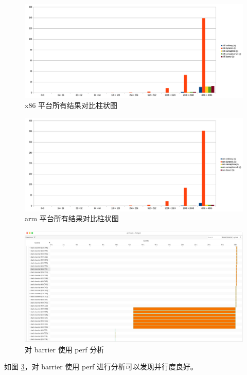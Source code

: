 \documentclass[a4paper]{article}
\begin{document}
\begin{figure}[h]
  \centering
  \includegraphics[width=\textwidth]{x86.png}
  \caption{x86 平台所有结果对比柱状图}
  \label{pic:x86}
\end{figure}

\begin{figure}[h]
  \centering
  \includegraphics[width=\textwidth]{arm.png}
  \caption{arm 平台所有结果对比柱状图}
  \label{pic:arm}
\end{figure}

\begin{figure}[h]
  \centering
  \includegraphics[width=\textwidth]{barrier-perf.png}
  \caption{对 barrier 使用 perf 分析}
  \label{pic:perf}
\end{figure}

如图 \ref{pic:perf}，对 barrier 使用 perf 进行分析可以发现并行度良好。



% 
% 
\end{document}
